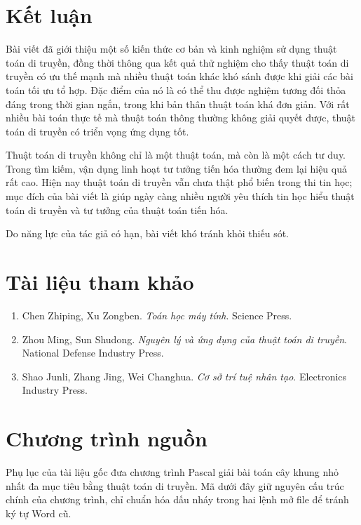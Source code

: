 \documentclass[11pt]{article}
\begin{document}
\section{Kết luận}

Bài viết đã giới thiệu một số kiến thức cơ bản và kinh nghiệm sử dụng thuật
toán di truyền, đồng thời thông qua kết quả thử nghiệm cho thấy thuật toán di
truyền có ưu thế mạnh mà nhiều thuật toán khác khó sánh được khi giải các bài
toán tối ưu tổ hợp. Đặc điểm của nó là có thể thu được nghiệm tương đối thỏa
đáng trong thời gian ngắn, trong khi bản thân thuật toán khá đơn giản. Với rất
nhiều bài toán thực tế mà thuật toán thông thường không giải quyết được, thuật
toán di truyền có triển vọng ứng dụng tốt.

Thuật toán di truyền không chỉ là một thuật toán, mà còn là một cách tư duy.
Trong tìm kiếm, vận dụng linh hoạt tư tưởng tiến hóa thường đem lại hiệu quả
rất cao. Hiện nay thuật toán di truyền vẫn chưa thật phổ biến trong thi tin
học; mục đích của bài viết là giúp ngày càng nhiều người yêu thích tin học
hiểu thuật toán di truyền và tư tưởng của thuật toán tiến hóa.

Do năng lực của tác giả có hạn, bài viết khó tránh khỏi thiếu sót.

\section*{Tài liệu tham khảo}

\begin{enumerate}
  \item Chen Zhiping, Xu Zongben. \emph{Toán học máy tính}. Science Press.
  \item Zhou Ming, Sun Shudong. \emph{Nguyên lý và ứng dụng của thuật toán di
  truyền}. National Defense Industry Press.
  \item Shao Junli, Zhang Jing, Wei Changhua. \emph{Cơ sở trí tuệ nhân tạo}.
  Electronics Industry Press.
\end{enumerate}

\appendix
\section{Chương trình nguồn}

Phụ lục của tài liệu gốc đưa chương trình Pascal giải bài toán cây khung nhỏ
nhất đa mục tiêu bằng thuật toán di truyền. Mã dưới đây giữ nguyên cấu trúc
chính của chương trình, chỉ chuẩn hóa dấu nháy trong hai lệnh mở file để tránh
ký tự Word cũ.
\end{document}
